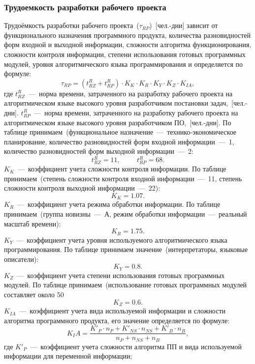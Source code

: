         \subsubsection{Трудоемкость разработки рабочего проекта}
            Трудоёмкость разработки рабочего проекта~($\tau_{RP}$)~[чел.-дни]
            зависит от функционального назначения программного продукта, количества
            разновидностей форм входной и выходной информации, сложности алгоритма
            функционирования, сложности контроля информации, степени использования
            готовых программных модулей, уровня алгоритмического языка
            программирования и определяется по формуле:
            $$\tau_{RP} = (t^R_{RZ} + t^R_{RP})\cdot K_K\cdot K_R\cdot K_Y \cdot K_Z\cdot K_{IA},$$
            где $t^R_{RZ}$~---~норма времени, затраченного на разработку рабочего проекта на алгоритмическом языке высокого уровня разработчиком постановки задач,~[чел.-дни].
            $t^R_{RP}$~---~норма времени, затраченного на разработку рабочего проекта на алгоритмическом языке высокого уровня разработчиком ПО,~[чел.-дни].
            По таблице принимаем~(функциональное назначение~---~технико-экономическое планирование,
            количество разновидностей форм входной информации~---~1,
            количество разновидностей форм выходной информации~---~2:
            $$t^R_{RZ} = 11,\hspace{1cm} t^R_{RP} = 68.$$
            $K_K$~---~коэффициент учета сложности контроля информации.
            По таблице принимаем~(степень сложности контроля входной информации~---~11, степень сложности контроля выходной информации~---~22):
            $$K_K = 1.07.$$
            $K_R$~---~коэффициент учета режима обработки информации.
            По таблице принимаем~(группа новизны~---~А, режим обработки информации~---~реальный масштаб времени):
            $$K_R = 1.75.$$
            $K_Y$~---~коэффициент учета уровня используемого алгоритмического языка программирования. По таблице принимаем значение~(интерпретаторы, языковые описатели):
            $$K_Y = 0.8.$$
            $K_Z$~---~коэффициент учета степени использования готовых программных модулей. По таблице принимаем~(использование готовых программных модулей составляет около 50%
            $$K_Z = 0.6.$$
            $K_{IA}$~---~коэффициент учета вида используемой информации и сложности алгоритма программного продукта, его значение определяется по формуле:
            $$K_IA = \dfrac {K'_P\cdot n_P + K'_{NS}\cdot n_{NS} + K'_B\cdot n_B} {n_P + n_{NS} + n_B },$$
            где $K'_P$~---~коэффициент учета сложности алгоритма ПП и вида используемой информации для переменной информации;
